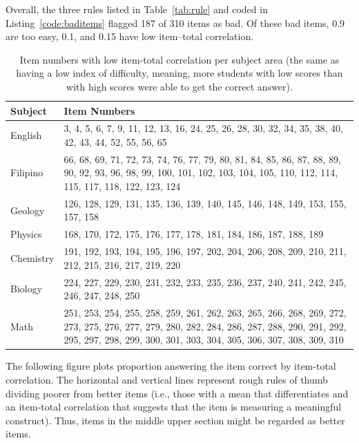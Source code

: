 \documentclass[10pt,man]{apa6}\usepackage{graphicx, color}
\begin{document}
Overall, the three rules listed in Table~\ref{tab:rule} and coded in Listing~\ref{code:baditems} flagged 
187 of 
310 items as bad. Of these bad items, 0.9 are too easy, 0.1, and 0.15 have low item--total correlation.

\begin{table}[ht]
\caption{\label{lowitem} Item numbers with low item-total correlation per subject area (the same as having a low index of difficulty, meaning, more students with low scores than with high scores were able to get the correct answer).}
\begin{tabular}{lp{}}
\toprule
Subject & Item Numbers\\
\midrule
English & 3, 4, 5, 6, 7, 9, 11, 12, 13, 16, 24, 25, 26, 28, 30, 32, 34, 35, 38, 40, 42, 43, 44, 52, 55, 56, 65\\
Filipino & 66, 68, 69, 71, 72, 73, 74, 76, 77, 79, 80, 81, 84, 85, 86, 87, 88, 89, 90, 92, 93, 96, 98, 99, 100, 101, 102, 103, 104, 105, 110, 112, 114, 115, 117, 118, 122, 123, 124\\
Geology & 126, 128, 129, 131, 135, 136, 139, 140, 145, 146, 148, 149, 153, 155, 157, 158\\
Physics & 168, 170, 172, 175, 176, 177, 178, 181, 184, 186, 187, 188, 189\\
Chemistry & 191, 192, 193, 194, 195, 196, 197, 202, 204, 206, 208, 209, 210, 211, 212, 215, 216, 217, 219, 220\\
Biology & 224, 227, 229, 230, 231, 232, 233, 235, 236, 237, 240, 241, 242, 245, 246, 247, 248, 250\\
Math & 251, 253, 254, 255, 258, 259, 261, 262, 263, 265, 266, 268, 269, 272, 273, 275, 276, 277, 279, 280, 282, 284, 286, 287, 288, 290, 291, 292, 295, 297, 298, 299, 300, 301, 303, 304, 305, 306, 307, 308, 309, 310\\
\bottomrule
\end{tabular}
\end{table}

\FloatBarrier






The following figure plots proportion answering the item
correct by item-total correlation.
The horizontal and vertical lines represent rough rules of thumb
 dividing poorer from better items
 (i.e., those with a mean that differentiates
 and an item-total correlation that suggests that the item
 is measuring a meaningful construct).
Thus, items in the middle upper section might be regarded as better items.
\end{document}
